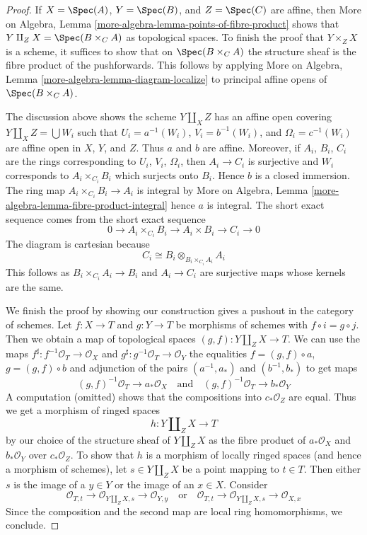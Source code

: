 \begin{proof}
\medskip\noindent
If $X = \Spec(A)$, $Y = \Spec(B)$, and $Z = \Spec(C)$ are affine, then
More on Algebra, Lemma \ref{more-algebra-lemma-points-of-fibre-product}
shows that $Y \amalg_Z X = \Spec(B \times_C A)$ as topological spaces.
To finish the proof that $Y \times_Z X$ is a scheme, it suffices to show
that on $\Spec(B \times_C A)$ the structure sheaf is the fibre product
of the pushforwards. This follows by applying
More on Algebra, Lemma \ref{more-algebra-lemma-diagram-localize}
to principal affine opens of $\Spec(B \times_C A)$.

\medskip\noindent
The discussion above shows the scheme $Y \amalg_X Z$
has an affine open covering $Y \amalg_X Z = \bigcup W_i$
such that $U_i = a^{-1}(W_i)$, $V_i = b^{-1}(W_i)$, and
$\Omega_i = c^{-1}(W_i)$ are affine open in $X$, $Y$, and $Z$.
Thus $a$ and $b$ are affine.
Moreover, if $A_i$, $B_i$, $C_i$ are the rings corresponding to
$U_i$, $V_i$, $\Omega_i$, then $A_i \to C_i$ is surjective and
$W_i$ corresponds to $A_i \times_{C_i} B_i$ which surjects onto
$B_i$. Hence $b$ is a closed immersion.
The ring map $A_i \times_{C_i} B_i \to A_i$ is integral by
More on Algebra, Lemma \ref{more-algebra-lemma-fibre-product-integral}
hence $a$ is integral.
The short exact sequence comes from the short exact sequence
$$
0 \to A_i \times_{C_i} B_i \to A_i \times B_i \to C_i \to 0
$$
The diagram is cartesian because
$$
C_i \cong B_i \otimes_{B_i \times_{C_i} A_i} A_i
$$
This follows as $B_i \times_{C_i} A_i \to B_i$
and $A_i \to C_i$ are surjective maps whose kernels are the same.

\medskip\noindent
We finish the proof by showing our construction gives a pushout
in the category of schemes.
Let $f : X \to T$ and $g : Y \to T$ be morphisms of schemes
with $f \circ i = g \circ j$. Then we obtain a map of topological
spaces $(g, f) : Y \amalg_Z X \to T$. We can use the maps
$f^\sharp : f^{-1}\mathcal{O}_T \to \mathcal{O}_X$ and
$g^\sharp : g^{-1}\mathcal{O}_T \to \mathcal{O}_Y$
the equalities $f = (g, f) \circ a$, $g = (g, f) \circ b$
and adjunction of the pairs $(a^{-1}, a_*)$ and $(b^{-1}, b_*)$
to get maps
$$
(g, f)^{-1}\mathcal{O}_T \to a_*\mathcal{O}_X
\quad\text{and}\quad
(g, f)^{-1}\mathcal{O}_T \to b_*\mathcal{O}_Y
$$
A computation (omitted) shows that the compositions
into $c_*\mathcal{O}_Z$ are equal. Thus we get a morphism
of ringed spaces
$$
h : Y \amalg_Z X \longrightarrow T
$$
by our choice of the structure sheaf of $Y \amalg_Z X$
as the fibre product of $a_*\mathcal{O}_X$ and $b_*\mathcal{O}_Y$
over $c_*\mathcal{O}_Z$. To show that $h$ is a morphism of
locally ringed spaces (and hence a morphism of schemes),
let $s \in Y \amalg_Z X$ be a point mapping to $t \in T$.
Then either $s$ is the image of a $y \in Y$ or the image of
an $x \in X$. Consider
$$
\mathcal{O}_{T, t} \to \mathcal{O}_{Y \amalg_Z X, s}
\to \mathcal{O}_{Y, y}
\quad\text{or}\quad
\mathcal{O}_{T, t} \to \mathcal{O}_{Y \amalg_Z X, s}
\to \mathcal{O}_{X, x}
$$
Since the composition and the second map are local ring homomorphisms,
we conclude.
\end{proof}

